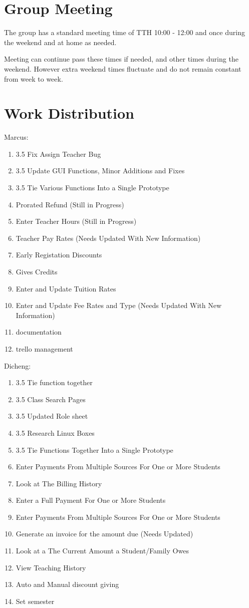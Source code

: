 \documentclass[11pt]{book}
\begin{document}
\section{Group Meeting}

The group has a standard meeting time of TTH 10:00 - 12:00 and once during the weekend and at home as needed.  

Meeting can continue pass these times if needed, and other times during the weekend. However extra weekend times fluctuate and do not remain constant from week to week. 

\section{Work Distribution}

Marcus:
\begin{enumerate}
\item 3.5 Fix Assign Teacher Bug
\item 3.5 Update GUI Functions, Minor Additions and Fixes
\item 3.5 Tie Various Functions Into a Single Prototype
\item Prorated Refund (Still in Progress)
\item Enter Teacher Hours (Still in Progress)
\item Teacher Pay Rates (Needs Updated With New Information)
\item Early Registation Discounts
\item Gives Credits
\item Enter and Update Tuition Rates
\item Enter and Update Fee Rates and Type (Needs Updated With New Information)
\item documentation
\item trello management\\
\end{enumerate}

Dicheng:
\begin{enumerate}
\item 3.5 Tie function together
\item 3.5 Class Search Pages
\item 3.5 Updated Role sheet
\item 3.5 Research Linux Boxes
\item 3.5 Tie Functions Together Into a Single Prototype
\item Enter Payments From Multiple Sources For One or More Students
\item Look at The Billing History
\item Enter a Full Payment For One or More Students
\item Enter Payments From Multiple Sources For One or More Students
\item Generate an invoice for the amount due (Needs Updated)
\item Look at a The Current Amount a Student/Family Owes
\item View Teaching History
\item Auto and Manual discount giving
\item Set semester
\end{enumerate}
\end{document}
